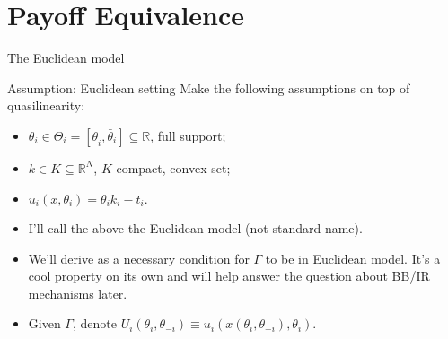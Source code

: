 \documentclass[english,10pt
,aspectratio=169
]{beamer}
\begin{document}
\section{Payoff Equivalence}

\begin{frame}{The Euclidean model}
\begin{alertblock}{Assumption: Euclidean setting}
	Make the following assumptions on top of quasilinearity:
	\begin{itemize}
		\item $\theta_i \in \Theta_{i} = [\underline{\theta}_i, \bar{\theta}_i] \subseteq \mathbb{R}$, full support;
		\item $k \in K \subseteq \mathbb{R}^N$, $K$ compact, convex set;
		\item $u_i(x,\theta_i) = \theta_i k_i - t_i$.
	\end{itemize}
\end{alertblock}
\begin{itemize}
	\item I'll call the above \alert{the Euclidean model} (not standard name).
	\item We'll derive  as a necessary condition for $\Gamma$ to be  in \alert{Euclidean} model. It's a cool property on its own and will help answer the question about BB/IR mechanisms later.
	\item Given $\Gamma$, denote $U_i(\theta_i, \theta_{-i}) \equiv u_i\left(x(\theta_i, \theta_{-i}), \theta_i \right)$.
\end{itemize}
\end{frame}
\end{document}

